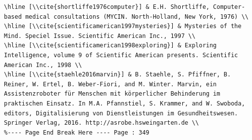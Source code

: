 \documentclass[10pt]{book}
\begin{document}
\begin{verbatim}
\hline [\\cite{shortliffe1976computer}] & E.H. Shortliffe, Computer-based medical consultations (MYCIN. North-Holland, New York, 1976) \\
\hline [\\cite{scientificamerican1997mysteries}] & Mysteries of the Mind. Speciel Issue. Scientific American Inc., 1997 \\
\hline [\\cite{scientificamerican1998exploring}] & Exploring Intelligence, volume 9 of Scientific American presents. Scientific American Inc., 1998 \\
\hline [\\cite{staehle2016marvin}] & B. Staehle, S. Pfiffner, B. Reiner, W. Ertel, B. Weber-Fiori, and M. Winter. Marvin, ein Assistenzroboter für Menschen mit körperlicher Behinderung im praktischen Einsatz. In M.A. Pfannstiel, S. Krammer, and W. Swoboda, editors, Digitalisierung von Dienstleistungen im Gesundheitswesen. Springer Verlag, 2016. http://asrobe.hsweingarten.de \\
%---- Page End Break Here ---- Page : 349


\end{verbatim}
\end{document}
